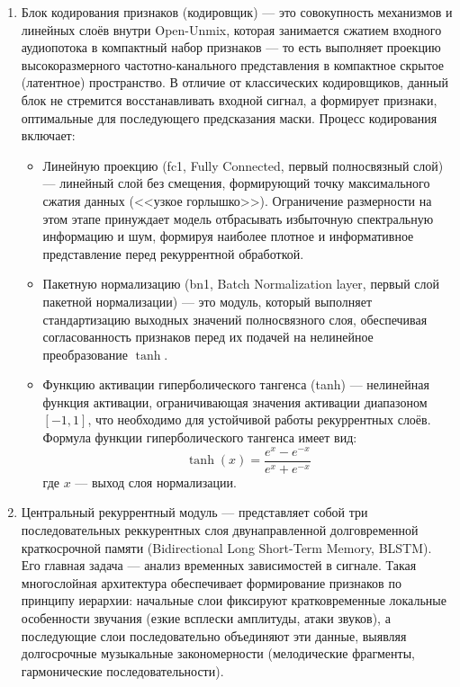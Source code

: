 \documentclass[14pt]{extarticle}
\begin{document}
\begin{enumerate}[label=\arabic*)]
\item Блок кодирования признаков (кодировщик) --- это совокупность механизмов и линейных слоёв внутри Open-Unmix, которая занимается сжатием 
входного аудиопотока в компактный набор признаков --- то есть выполняет проекцию высокоразмерного частотно-канального представления в компактное
 скрытое (латентное) пространство.
В отличие от классических кодировщиков, данный блок не стремится восстанавливать входной сигнал, а формирует признаки, оптимальные для 
последующего предсказания маски. Процесс кодирования включает:
    \begin{itemize}[label=$\bullet$, wide]
		\item Линейную проекцию (fc1, Fully Connected, первый полносвязный слой) --- линейный слой без смещения, формирующий точку максимального сжатия данных (<<узкое горлышко>>).
		Ограничение размерности на этом этапе принуждает модель отбрасывать избыточную спектральную информацию и шум, формируя наиболее плотное и информативное представление перед рекуррентной обработкой.
		\item Пакетную нормализацию (bn1, Batch Normalization layer, первый слой пакетной нормализации) --- это модуль, который выполняет стандартизацию выходных 
		значений полносвязного слоя, обеспечивая согласованность признаков перед их подачей на нелинейное преобразование $\tanh$.
		\item Функцию активации гиперболического тангенса (tanh) --- нелинейная функция активации, ограничивающая значения активации
		диапазоном $[-1, 1]$, что необходимо для устойчивой работы рекуррентных слоёв.
		Формула функции гиперболического тангенса имеет вид:
		\begin{equation}
			\label{eq:tanh}
			\tanh(x) = \frac{e^{x} - e^{-x}}{e^{x} + e^{-x}}
		\end{equation}
		где $x$ --- выход слоя нормализации.
	\end{itemize}
\item Центральный рекуррентный модуль --- представляет собой три последовательных реккурентных слоя 
двунаправленной долговременной краткосрочной памяти (Bidirectional Long Short-Term Memory, BLSTM). 
Его главная задача --- анализ временных зависимостей в сигнале.
Такая многослойная архитектура обеспечивает формирование признаков по принципу иерархии: начальные слои фиксируют кратковременные 
локальные особенности звучания (езкие всплески амплитуды, атаки звуков), а последующие слои последовательно 
объединяют эти данные, выявляя долгосрочные музыкальные закономерности (мелодические фрагменты, гармонические последовательности).


\end{enumerate}
\end{document}
